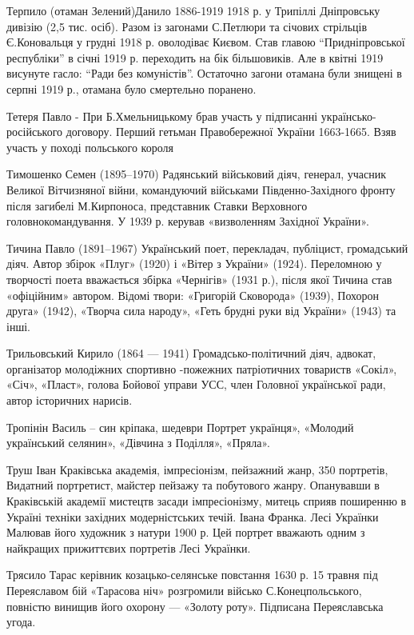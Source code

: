 Терпило (отаман Зелений)Данило   1886-1919 1918 р. у Трипіллі Дніпровську дивізію (2,5 тис. осіб). Разом із загонами С.Петлюри та січових стрільців Є.Коновальця у грудні 1918 р. оволодіває Києвом. Став главою “Придніпровської республіки” в січні 1919 р. переходить на бік більшовиків. Але в квітні 1919 висунуте гасло: “Ради без комуністів”. Остаточно загони отамана були знищені в серпні 1919 р., отамана було смертельно поранено. 

Тетеря Павло  - При Б.Хмельницькому брав участь у підписанні українсько-російського договору. Перший гетьман Правобережної України 1663-1665. Взяв участь у поході польського короля

Тимошенко Семен (1895–1970) Радянський військовий діяч, генерал, учасник Великої Вітчизняної війни, командуючий військами Південно-Західного фронту після загибелі М.Кирпоноса, представник Ставки Верховного головнокомандування. У 1939 р. керував «визволенням Західної України».

Тичина Павло (1891–1967) Український поет, перекладач, публіцист, громадський діяч. Автор збірок «Плуг» (1920) і «Вітер з України» (1924). Переломною у творчості поета вважається збірка «Чернігів» (1931 р.), після якої Тичина став «офіційним» автором. Відомі твори: «Григорій Сковорода» (1939), Похорон друга» (1942), «Творча сила народу», «Геть брудні руки від України» (1943) та інші.

Трильовський Кирило (1864 — 1941) Громадсько-політичний діяч, адвокат, організатор молодіжних спортивно -пожежних патріотичних товариств «Сокіл», «Січ», «Пласт», голова Бойової управи УСС, член Головної української ради, автор історичних нарисів.

Тропінін Василь – син кріпака, шедеври Портрет українця», «Молодий український селянин», «Дівчина з Поділля», «Пряла».

Труш Іван Краківська академія, імпресіонізм,  пейзажний жанр, 350 портретів, Видатний портретист, майстер пейзажу та побутового жанру. Опанувавши в Краківській академії мистецтв засади імпресіонізму, митець сприяв поширенню в Україні техніки західних модерністських течій. Івана Франка.  Лесі Українки Малював його художник з натури 1900 р. Цей портрет вважають одним з найкращих прижиттєвих портретів Лесі Українки.  

Трясило Тарас керівник козацько-селянське повстання 1630 р. 15 травня під Переяславом бій «Тарасова ніч» розгромили військо С.Конецпольського, повністю винищив його охорону — «Золоту роту». Підписана Переяславська угода.

